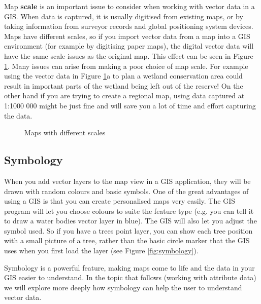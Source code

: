 Map \textbf{scale} is an important issue to consider when working with vector
data in
a GIS. When data is captured, it is usually digitised from existing maps, or
by taking information from surveyor records and global positioning system
devices. Maps have different scales, so if you import vector data from a map
into a GIS environment (for example by digitising paper maps), the digital
vector data will have the same scale issues as the original map. This effect
can be seen in Figure \ref{fig:mapscales}. Many issues can arise from making
a poor choice of map scale. For example using the vector data in Figure
\ref{fig:mapscales}a to plan a wetland conservation area could result in
important parts of the wetland being left out of the reserve! On the other
hand if you are trying to create a regional map, using data captured at
1:1000 000 might be just fine and will save you a lot of time and effort
capturing the data.

\begin{figure}[ht]
\centering
\caption{Maps with different scales}\label{fig:mapscales}
   \goodgap
   \goodgap
\end{figure}

\subsection{Symbology}\label{subsec:symbology}

When you add vector layers to the map view in a GIS application, they will be
drawn with random colours and basic symbols. One of the great advantages of
using a GIS is that you can create personalised maps very easily. The GIS
program will let you choose colours to suite the feature type (e.g. you can
tell it to draw a water bodies vector layer in blue). The GIS will also let
you adjust the symbol used. So if you have a trees point layer, you can show
each tree position with a small picture of a tree, rather than the basic
circle marker that the GIS uses when you first load the layer (see Figure
\ref{fig:symbology}).

Symbology is a powerful feature, making maps come to life and the data in
your GIS easier to understand. In the topic that follows (working with
attribute data) we will explore more deeply how symbology can help the user
to understand vector data.

